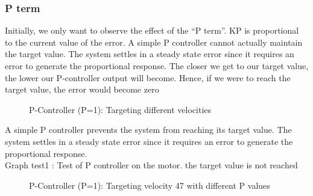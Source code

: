 \subsubsection*{P term}
Initially, we only want to observe the effect of the ``P term''.
KP is proportional to the current value of the error.
A simple P controller cannot actually maintain the target value. The system settles in a steady state error since it requires an error to generate the proportional response.
The closer we get to our target value, the lower our P-controller output will become. Hence, if we were to reach the target value, the error would become zero

\begin{figure}
    \centering
{}
    \caption{P-Controller (P=1): Targeting different velocities} \label{fig:P1}
\end{figure}


A simple P controller prevents the system from reaching its target value. The system settles in a steady state error since it requires an error to generate the proportional response.\\
Graph test1 : Test of P controller on the motor. the target value is not reached
\begin{figure}
    \centering
{}
    \caption{P-Controller (P=1): Targeting velocity 47 with different P values} \label{fig:P_demo}
\end{figure}

